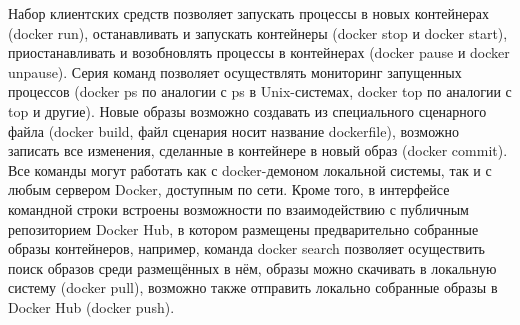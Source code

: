 Набор клиентских средств позволяет запускать процессы в новых контейнерах (docker run), останавливать и запускать контейнеры (docker stop и docker start), приостанавливать и возобновлять процессы в контейнерах (docker pause и docker unpause). Серия команд позволяет осуществлять мониторинг запущенных процессов (docker ps по аналогии с ps в Unix-системах, docker top по аналогии с top и другие). Новые образы возможно создавать из специального сценарного файла (docker build, файл сценария носит название dockerfile), возможно записать все изменения, сделанные в контейнере в новый образ (docker commit). Все команды могут работать как с docker-демоном локальной системы, так и с любым сервером Docker, доступным по сети. Кроме того, в интерфейсе командной строки встроены возможности по взаимодействию с публичным репозиторием Docker Hub, в котором размещены предварительно собранные образы контейнеров, например, команда docker search позволяет осуществить поиск образов среди размещённых в нём, образы можно скачивать в локальную систему (docker pull), возможно также отправить локально собранные образы в Docker Hub (docker push).
